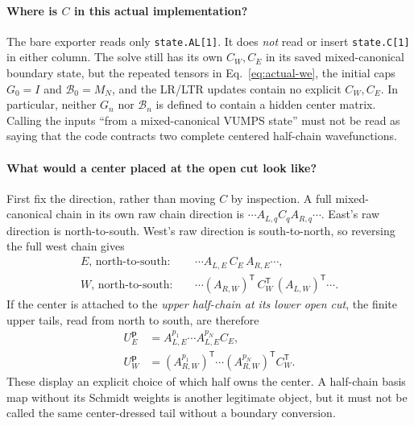 \documentclass[11pt]{article}
\newcommand{\code}[1]{{\small\nolinkurl{#1}}}
\begin{document}
\paragraph{Where is $C$ in this actual implementation?}
The bare exporter reads only \code{state.AL[1]}. It does \emph{not} read or
insert \code{state.C[1]} in either column. The solve still has its own
$C_W,C_E$ in its saved mixed-canonical boundary state, but the repeated
tensors in Eq.~\eqref{eq:actual-we}, the initial caps $G_0=I$ and
$\mathcal B_0=M_N$, and the LR/LTR updates contain no explicit $C_W,C_E$.
In particular, neither $G_n$ nor $\mathcal B_n$ is defined to contain a
hidden center matrix. Calling the inputs ``from a mixed-canonical VUMPS
state'' must not be read as saying that the code contracts two complete
centered half-chain wavefunctions.

\paragraph{What would a center placed at the open cut look like?}
First fix the direction, rather than moving $C$ by inspection. A full
mixed-canonical chain in its own raw chain direction is
$\cdots A_{L,q}C_q A_{R,q}\cdots$. East's raw direction is north-to-south.
West's raw direction is south-to-north, so reversing the full west chain gives
\begin{align}
 E\text{, north-to-south}:&\quad
 \cdots A_{L,E}\,C_E\,A_{R,E}\cdots,\\
 W\text{, north-to-south}:&\quad
 \cdots (A_{R,W})^{\mathsf T}\,C_W^{\mathsf T}
                       \, (A_{L,W})^{\mathsf T}\cdots.
\end{align}
If the center is attached to the \emph{upper half-chain at its lower open
cut}, the finite upper tails, read from north to south, are therefore
\begin{align}\label{eq:cut-centered-tails}
 U_E^{\mathbf p}&=A_{L,E}^{p_1}\cdots A_{L,E}^{p_N}C_E,\\
 U_W^{\mathbf p}&=(A_{R,W}^{p_1})^{\mathsf T}\cdots
                  (A_{R,W}^{p_N})^{\mathsf T}C_W^{\mathsf T}.
\end{align}
These display an explicit choice of which half owns the center. A half-chain
basis map without its Schmidt weights is another legitimate object, but it
must not be called the same center-dressed tail without a boundary conversion.
\end{document}
